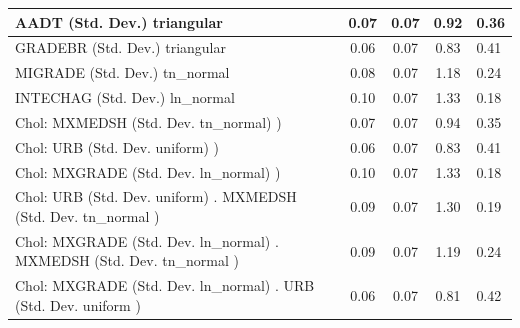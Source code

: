 \begin{table}
\begin{center}
\begin{tabular}{|l|l|c|c|c|l|}
			\hline
			AADT (Std. Dev.) triangular &  & 0.07 & 0.07 & 0.92 & 0.36 \\
			\hline
			GRADEBR (Std. Dev.) triangular &  & 0.06 & 0.07 & 0.83 & 0.41 \\
			\hline
			MIGRADE (Std. Dev.) tn_normal &  & 0.08 & 0.07 & 1.18 & 0.24 \\
			\hline
			INTECHAG (Std. Dev.) ln_normal &  & 0.10 & 0.07 & 1.33 & 0.18 \\
			\hline
			 Chol: MXMEDSH (Std. Dev. tn_normal) ) &  & 0.07 & 0.07 & 0.94 & 0.35 \\
			\hline
			 Chol: URB (Std. Dev. uniform) ) &  & 0.06 & 0.07 & 0.83 & 0.41 \\
			\hline
			 Chol: MXGRADE (Std. Dev. ln_normal) ) &  & 0.10 & 0.07 & 1.33 & 0.18 \\
			\hline
			 Chol: URB (Std. Dev. uniform) . MXMEDSH (Std. Dev.   tn_normal ) &  & 0.09 & 0.07 & 1.30 & 0.19 \\
			\hline
			 Chol: MXGRADE (Std. Dev. ln_normal) . MXMEDSH (Std. Dev.   tn_normal ) &  & 0.09 & 0.07 & 1.19 & 0.24 \\
			\hline
			 Chol: MXGRADE (Std. Dev. ln_normal) . URB (Std. Dev.   uniform ) &  & 0.06 & 0.07 & 0.81 & 0.42 \\
			\hline
		\end{tabular}
	\end{center}
\end{table}